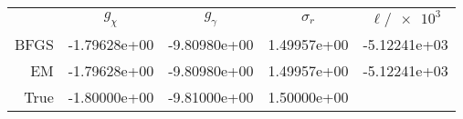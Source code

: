 \begin{tabular}{rSSSS[fixed-exponent=3]}
\toprule
&&&&\\\otoprule
BFGS&-1.79628e+00&-9.80980e+00&1.49957e+00&-5.12241e+03\\
EM&-1.79628e+00&-9.80980e+00&1.49957e+00&-5.12241e+03\\
True&-1.80000e+00&-9.81000e+00&1.50000e+00&\\
\bottomrule\end{tabular}
